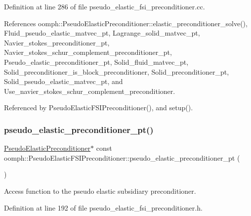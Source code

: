 Definition at line 286 of file pseudo\+\_\+elastic\+\_\+fsi\+\_\+preconditioner.\+cc.



References oomph\+::\+Pseudo\+Elastic\+Preconditioner\+::elastic\+\_\+preconditioner\+\_\+solve(), Fluid\+\_\+pseudo\+\_\+elastic\+\_\+matvec\+\_\+pt, Lagrange\+\_\+solid\+\_\+matvec\+\_\+pt, Navier\+\_\+stokes\+\_\+preconditioner\+\_\+pt, Navier\+\_\+stokes\+\_\+schur\+\_\+complement\+\_\+preconditioner\+\_\+pt, Pseudo\+\_\+elastic\+\_\+preconditioner\+\_\+pt, Solid\+\_\+fluid\+\_\+matvec\+\_\+pt, Solid\+\_\+preconditioner\+\_\+is\+\_\+block\+\_\+preconditioner, Solid\+\_\+preconditioner\+\_\+pt, Solid\+\_\+pseudo\+\_\+elastic\+\_\+matvec\+\_\+pt, and Use\+\_\+navier\+\_\+stokes\+\_\+schur\+\_\+complement\+\_\+preconditioner.



Referenced by Pseudo\+Elastic\+F\+S\+I\+Preconditioner(), and setup().

\mbox{\label{classoomph_1_1PseudoElasticFSIPreconditioner_af10b20ad8e90cd99ba35326f1207d6a7}} 
\subsubsection{\texorpdfstring{pseudo\+\_\+elastic\+\_\+preconditioner\+\_\+pt()}{pseudo\_elastic\_preconditioner\_pt()}}
{\footnotesize\ttfamily \hyperlink{classoomph_1_1PseudoElasticPreconditioner}{Pseudo\+Elastic\+Preconditioner}$\ast$ const oomph\+::\+Pseudo\+Elastic\+F\+S\+I\+Preconditioner\+::pseudo\+\_\+elastic\+\_\+preconditioner\+\_\+pt (\begin{DoxyParamCaption}{ }\end{DoxyParamCaption})\hspace{0.3cm}{\ttfamily [inline]}}



Access function to the pseudo elastic subsidiary preconditioner. 



Definition at line 192 of file pseudo\+\_\+elastic\+\_\+fsi\+\_\+preconditioner.\+h.



